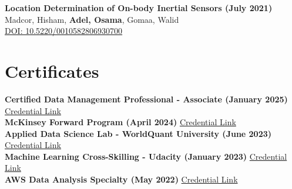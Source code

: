 \documentclass[10pt, letterpaper]{article}
\begin{document}
\textbf{Location Determination of On-body Inertial Sensors (July 2021)} \\
Madcor, Hisham, \textbf{Adel, Osama}, Gomaa, Walid \\
\href{https://doi.org/10.5220/0010582806930700}{DOI: 10.5220/0010582806930700}


\vspace{0.3cm}

\section{Certificates}
\textbf{Certified Data Management Professional - Associate (January 2025)} \href{https://eu.credential.net/037dbe8a-65a0-43be-96f3-a6278cb7c41c}{Credential Link} \\
\textbf{McKinsey Forward Program (April 2024)} \href{https://www.credly.com/badges/b0027fda-b653-4e6d-8118-91d3a252c0b7}{Credential Link} \\
\textbf{Applied Data Science Lab - WorldQuant University (June 2023)} \href{https://www.credly.com/badges/992d91ad-7584-47f7-ac98-67d6658c1b73}{Credential Link} \\
\textbf{Machine Learning Cross-Skilling - Udacity (January 2023)} \href{https://www.udacity.com/certificate/e/5b2676be-7175-11ed-942c-4f1c788a040d}{Credential Link} \\
\textbf{AWS Data Analysis Specialty (May 2022)} \href{https://www.credly.com/badges/eb3fb25c-8fd7-4140-b5ca-4f30fb47d1c9}{Credential Link}
\end{document}
